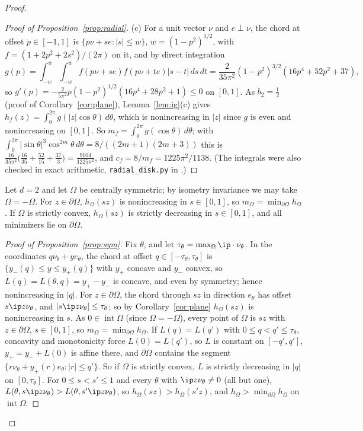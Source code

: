 \begin{proof}
\begin{proof}[Proof of Proposition~\ref{prop:radial}]
(c) For a unit vector $\nu$ and $e\perp\nu$, the chord at offset $p\in[-1,1]$ is $\{p\nu+se:|s|\le w\}$, $w=(1-p^2)^{1/2}$, with $f=(1+2p^2+2s^2)/(2\pi)$ on it, and by
direct integration
\[
  g(p)=\int_{-w}^w\!\!\int_{-w}^w f(p\nu+se)f(p\nu+te)|s-t|\,ds\,dt=\frac{2}{35\pi^2}(1-p^2)^{3/2}(16p^4+52p^2+37),
\]
so $g'(p)=-\frac{2}{5\pi^2}p(1-p^2)^{1/2}(16p^4+28p^2+1)\le0$ on $[0,1]$. As $b_2=\frac12$ (proof of Corollary~\ref{cor:plane}),
Lemma~\ref{lem:ig}(c) gives $h_f(z)=\int_0^{2\pi}g(|z|\cos\theta)\,d\theta$, which is nonincreasing in $|z|$ since $g$ is even and
nonincreasing on $[0,1]$. So $m_f=\int_0^{2\pi}g(\cos\theta)\,d\theta$; with $\int_0^{2\pi}|\sin\theta|^3\cos^{2m}\theta\,d\theta=8/((2m+1)(2m+3))$ this
is $\frac{16}{35\pi^2}\bigl(\frac{16}{35}+\frac{52}{15}+\frac{37}3\bigr)=\frac{9104}{1225\pi^2}$, and $c_f=8/m_f=1225\pi^2/1138$. (The integrals
were also checked in exact arithmetic, \texttt{radial\_disk.py} in \cite{Repo}.)
\end{proof}

\begin{proposition}\label{prop:sym}
Let $d=2$ and let $\Omega$ be centrally symmetric; by isometry invariance we may take $\Omega=-\Omega$. For $z\in\partial\Omega$,
$h_\Omega(sz)$ is nonincreasing in $s\in[0,1]$, so $m_\Omega=\min_{\partial\Omega}h_\Omega$. If $\Omega$ is strictly convex, $h_\Omega(sz)$ is
strictly decreasing in $s\in[0,1]$, and all minimizers lie on $\partial\Omega$.
\end{proposition}

\begin{proof}[Proof of Proposition~\ref{prop:sym}]
Fix $\theta$, and let $\tau_\theta=\max_\Omega\ip\cdot{\nu_\theta}$. In the coordinates $q\nu_\theta+ye_\theta$, the chord at offset $q\in[-\tau_\theta,\tau_\theta]$ is
$\{y_-(q)\le y\le y_+(q)\}$ with $y_+$ concave and $y_-$ convex, so $L(q)=L(\theta,q)=y_+-y_-$ is concave, and even by symmetry;
hence nonincreasing in $|q|$. For $z\in\partial\Omega$, the chord through $sz$ in direction $e_\theta$ has offset $s\ip z{\nu_\theta}$, and
$|s\ip z{\nu_\theta}|\le \tau_\theta$; so by Corollary~\ref{cor:plane} $h_\Omega(sz)$ is nonincreasing in $s$. As $0\in\operatorname{int}\Omega$ (since $\Omega=-\Omega$), every point of $\Omega$
is $sz$ with $z\in\partial\Omega$, $s\in[0,1]$, so $m_\Omega=\min_{\partial\Omega}h_\Omega$. If $L(q)=L(q')$ with $0\le q<q'\le \tau_\theta$, concavity and monotonicity force
$L(0)=L(q')$, so $L$ is constant on $[-q',q']$, $y_+=y_-+L(0)$ is affine there, and $\partial\Omega$ contains the segment
$\{r\nu_\theta+y_+(r)e_\theta:|r|\le q'\}$. So if $\Omega$ is strictly convex, $L$ is strictly decreasing in $|q|$ on $[0,\tau_\theta]$. For
$0\le s<s'\le1$ and every $\theta$ with $\ip z{\nu_\theta}\ne0$ (all but one), $L(\theta,s\ip z{\nu_\theta})>L(\theta,s'\ip z{\nu_\theta})$, so
$h_\Omega(sz)>h_\Omega(s'z)$, and $h_\Omega>\min_{\partial\Omega}h_\Omega$ on $\operatorname{int}\Omega$.
\end{proof}


\end{proof}
